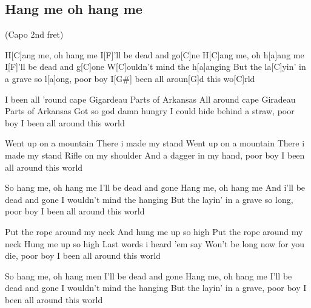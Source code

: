 \subsection*{Hang me oh hang me   }
\begin{guitar}
(Capo 2nd fret)

H[C]ang me, oh hang me
I[F]'ll be dead and go[C]ne
H[C]ang me, oh h[a]ang me
I[F]'ll be dead and g[C]one
W[C]ouldn't mind the h[a]anging
But the la[C]yin' in a grave so l[a]ong, poor boy
I[G#] been all aroun[G]d this wo[C]rld

I been all 'round cape Gigardeau
Parts of Arkansas
All around cape Giradeau
Parts of Arkansas
Got so god damn hungry
I could hide behind a straw, poor boy
I been all around this world

Went up on a mountain
There i made my stand
Went up on a mountain
There i made my stand
Rifle on my shoulder
And a dagger in my hand, poor boy
I been all around this world

So hang me, oh hang me
I'll be dead and gone
Hang me, oh hang me
And i'll be dead and gone
I wouldn't mind the hanging
But the layin' in a grave so long, poor boy
I been all around this world

Put the rope around my neck
And hung me up so high
Put the rope around my neck
Hung me up so high
Last words i heard 'em say
Won't be long now for you die, poor boy
I been all around this world

So hang me, oh hang men
I'll be dead and gone
Hang me, oh hang me
I'll be dead and gone
I wouldn't mind the hanging
But the layin' in a grave, poor boy
I been all around this world 
\end{guitar}
